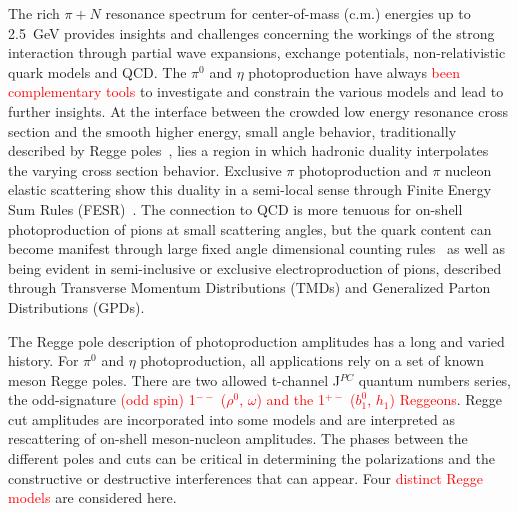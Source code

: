 \documentclass[aps,prc,twocolumn,floatfix,showpacs,preprintnumbers,amsmath,amssymb,superscriptaddress,linenumbers]{revtex4-1}
\begin{document}
The rich $\pi + N$ resonance spectrum for center-of-mass 
(c.m.) energies up to 2.5~GeV provides insights and challenges concerning 
the workings of the strong interaction through partial wave expansions, 
exchange potentials, non-relativistic quark models and QCD. The $\pi^0$ 
and $\eta$ photoproduction have always \textcolor{red}{been complementary tools} to 
investigate and constrain the various models and lead to further 
insights. At the interface between the crowded low energy resonance 
cross section and the smooth higher energy, small angle behavior, 
traditionally described by Regge poles~\cite{Ader:1967tqj}, lies a 
region in which hadronic duality interpolates the varying cross section 
behavior. Exclusive $\pi$ photoproduction and $\pi$ nucleon elastic 
scattering show this duality in a semi-local sense through Finite Energy 
Sum Rules (FESR)~\cite{Armenian:1974xd}. The connection to QCD is more 
tenuous for on-shell photoproduction of pions at small scattering angles, 
but the quark content can become manifest through large fixed angle 
dimensional counting rules~\cite{Brodsky:1973kr} as well as being evident 
in semi-inclusive or exclusive electroproduction of pions, described 
through Transverse Momentum Distributions (TMDs)  and Generalized Parton 
Distributions (GPDs).


The Regge pole description of photoproduction amplitudes 
has a long and varied history. For $\pi^0$ and $\eta$ photoproduction, 
all applications rely on a set of known meson Regge poles. There are 
two allowed t-channel J$^{PC}$ quantum numbers series, the odd-signature\textcolor{red}{ (odd spin) 
1$^{--}$ ($\rho^0$, $\omega$) and the 1$^{+-}$ ($b^0_1$, $h_1$) Reggeons}. Regge cut amplitudes are 
incorporated into some models and are interpreted as rescattering of 
on-shell meson-nucleon amplitudes.  The phases between the different 
poles and cuts can be critical in determining the polarizations and the 
constructive or destructive interferences that can appear. Four \textcolor{red}{distinct Regge models} 
are considered here.
\end{document}
